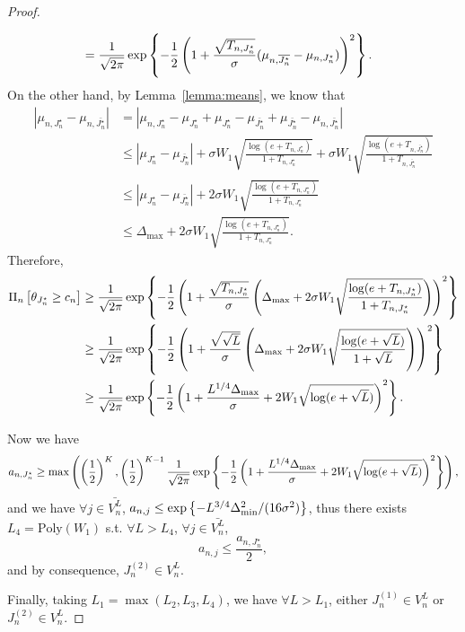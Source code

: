 \begin{proof}
\begin{itemize}
\begin{align*}
                                            &=
            \frac{1}{\sqrt{2\pi}} \exp\left\{-\frac{1}{2}\left( 1+\frac{\sqrt{T_{n,J_n^\star}}}{\sigma}(\mu_{n,\overline{J_n^\star}}-\mu_{n,J_n^\star}) \right)^2\right\}.
        \end{align*}
        On the other hand, by Lemma~\ref{lemma:means}, we know that
        \begin{align*}
            |\mu_{n,J_n^\star} - \mu_{n,\bar{J_n^\star}}| &= |\mu_{n,J_n^\star} - \mu_{J_n^\star} + \mu_{J_n^\star} - \mu_{\bar{J_n^\star}} + \mu_{\bar{J_n^\star}} - \mu_{n,\bar{J_n^\star}}|\\
                                                          &\leq
            |\mu_{J_n^\star} - \mu_{\bar{J_n^\star}}| + \sigma W_1 \sqrt{\frac{\log(e+T_{n,J_n^\star})}{1+T_{n,J_n^\star}}} + \sigma W_1 \sqrt{\frac{\log(e+T_{n,\bar{J_n^\star}})}{1+T_{n,\bar{J_n^\star}}}}\\
                                                          &\leq
            |\mu_{J_n^\star} - \mu_{\bar{J_n^\star}}| + 2\sigma W_1 \sqrt{\frac{\log(e+T_{n,J_n^\star})}{1+T_{n,J_n^\star}}}\\
                                                          &\leq
            \Delta_{\max} + 2\sigma W_1 \sqrt{\frac{\log(e+T_{n,J_n^\star})}{1+T_{n,J_n^\star}}}.
        \end{align*}
        Therefore,
        \begin{align*}
            \Pi_{n}\left[\theta_{J_n^\star}\geq c_n\right] &\geq \frac{1}{\sqrt{2\pi}} \exp\left\{-\frac{1}{2}\left( 1+\frac{\sqrt{T_{n,J_n^\star}}}{\sigma}\left(\Delta_{\max} + 2\sigma W_1 \sqrt{\frac{\log(e+T_{n,J_n^\star})}{1+T_{n,J_n^\star}}}\right) \right)^2\right\}\\
                                            &\geq
            \frac{1}{\sqrt{2\pi}} \exp\left\{-\frac{1}{2}\left( 1+\frac{\sqrt{\sqrt{L}}}{\sigma}\left(\Delta_{\max} + 2\sigma W_1 \sqrt{\frac{\log(e+\sqrt{L})}{1+\sqrt{L}}}\right) \right)^2\right\}\\
                                            &\geq
            \frac{1}{\sqrt{2\pi}} \exp\left\{-\frac{1}{2}\left( 1+\frac{L^{1/4}\Delta_{\max}}{\sigma} + 2 W_1 \sqrt{\log(e+\sqrt{L})} \right)^2\right\}.
        \end{align*}
    \end{itemize}
    Now we have
    \[
        a_{n,J_n^\star} \geq \max\left( \left(\frac{1}{2}\right)^K, \left(\frac{1}{2}\right)^{K-1}\frac{1}{\sqrt{2\pi}}\exp\left\{-\frac{1}{2}\left( 1+\frac{L^{1/4}\Delta_{\max}}{\sigma} + 2 W_1 \sqrt{\log(e+\sqrt{L})} \right)^2\right\} \right),
    \]
    and we have $\forall j\in \bar{V_n^L}$, $a_{n,j}\leq \exp\left\{-L^{3/4}\Delta_{\text{min}}^2/(16\sigma^2)\right\}$, thus there exists $L_4 = \text{Poly}(W_1)$ s.t. $\forall L > L_4$, $\forall j \in \bar{V_n^L}$,
    \[
        a_{n,j} \leq \frac{a_{n,J_n^\star}}{2},
    \]
    and by consequence, $J_n^{(2)}\in V_n^L$.
    
    Finally, taking $L_1 = \max(L_2, L_3, L_4)$, we have $\forall L > L_1$, either $J_n^{(1)} \in V_n^L$ or $J_n^{(2)} \in V_n^L$.
\end{proof}


